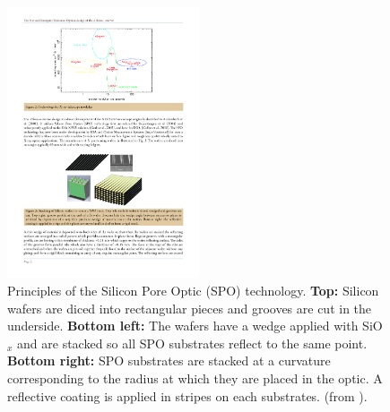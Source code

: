 \begin{figure}[!h]
  \center
  \includegraphics[height=8cm]{figures/athena/spo_principle1.pdf}
\caption{\footnotesize Principles of the Silicon Pore Optic (SPO) technology. \textbf{Top:} Silicon wafers are diced into rectangular pieces and grooves are cut in the underside. \textbf{Bottom left:} The wafers have a wedge applied with SiO$_x$ and are stacked so all SPO substrates reflect to the same point. \textbf{Bottom right:} SPO substrates are stacked at a curvature corresponding to the radius at which they are placed in the optic. A reflective coating is applied in stripes on each substrates. (from \cite{Willingale:2013vo}).}\label{fig:spo_principle1}
\end{figure}


